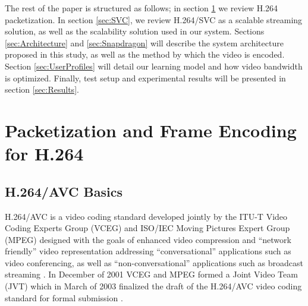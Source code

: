 \documentclass[preprint, 12pt]{elsarticle}
\begin{document}
The rest of the paper is structured as follows; in section \ref{sec:Packetization} we review H.264 packetization. In section \ref{sec:SVC}, we review H.264/SVC as a scalable streaming solution, as well as the scalability solution used in our system. Sections \ref{sec:Architecture} and \ref{sec:Snapdragon} will describe the system architecture proposed in this study, as well as the method by which the video is encoded. Section \ref{sec:UserProfiles} will detail our learning model and how video bandwidth is optimized. Finally, test setup and experimental results will be presented in section \ref{sec:Results}.


\section{Packetization and Frame Encoding for H.264}
\label{sec:Packetization}

\subsection{H.264/AVC Basics}

H.264/AVC is a video coding standard developed jointly by the ITU-T Video Coding Experts Group (VCEG) and ISO/IEC Moving Pictures Expert Group (MPEG) designed with the goals of enhanced video compression and ``network friendly'' video representation addressing ``conversational'' applications such as video conferencing, as well as ``non-conversational'' applications such as broadcast streaming \cite{H264AVCOverview}. In December of 2001 VCEG and MPEG formed a Joint Video Team (JVT) which in March of 2003 finalized the draft of the H.264/AVC video coding standard for formal submission \cite{H264AVCOverview}. 
\end{document}
